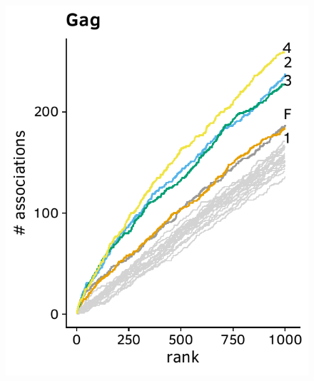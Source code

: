 \documentclass[a4paper,11pt]{article}
\begin{document}
\begin{figure}[H]
    \begin{minipage}{.49\textwidth}
      \includegraphics[width=\linewidth]{plots/comparison_plots/hiv_brumme/gag_new_map.pdf}
    \end{minipage}
    \begin{minipage}{.49\textwidth}

\end{minipage}
\end{figure}
\end{document}
